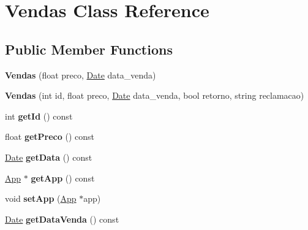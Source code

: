 \hypertarget{class_vendas}{\section{Vendas Class Reference}
\label{class_vendas}
}
\subsection*{Public Member Functions}
\begin{DoxyCompactItemize}
\item 
\hypertarget{class_vendas_a82262941ae2af8e2527d1859ebc7f5cd}{{\bfseries Vendas} (float preco, \hyperlink{class_date}{Date} data\+\_\+venda)}\label{class_vendas_a82262941ae2af8e2527d1859ebc7f5cd}

\item 
\hypertarget{class_vendas_a84f1ab71befc84a221bc4961f11cb934}{{\bfseries Vendas} (int id, float preco, \hyperlink{class_date}{Date} data\+\_\+venda, bool retorno, string reclamacao)}\label{class_vendas_a84f1ab71befc84a221bc4961f11cb934}

\item 
\hypertarget{class_vendas_a7e36a98494bec3b57d90afa0536a1be5}{int {\bfseries get\+Id} () const }\label{class_vendas_a7e36a98494bec3b57d90afa0536a1be5}

\item 
\hypertarget{class_vendas_aa5c8bcaced98ded9a22444ddf5935566}{float {\bfseries get\+Preco} () const }\label{class_vendas_aa5c8bcaced98ded9a22444ddf5935566}

\item 
\hypertarget{class_vendas_ab4f3bd058d7cfe6fc837e7804b9b3dcf}{\hyperlink{class_date}{Date} {\bfseries get\+Data} () const }\label{class_vendas_ab4f3bd058d7cfe6fc837e7804b9b3dcf}

\item 
\hypertarget{class_vendas_ab900328b9ac3c5e072ad6d7a42f530a3}{\hyperlink{class_app}{App} $\ast$ {\bfseries get\+App} () const }\label{class_vendas_ab900328b9ac3c5e072ad6d7a42f530a3}

\item 
\hypertarget{class_vendas_aeb3fa665d5c3aaf74caf7c1f024f545c}{void {\bfseries set\+App} (\hyperlink{class_app}{App} $\ast$app)}\label{class_vendas_aeb3fa665d5c3aaf74caf7c1f024f545c}

\item 
\hypertarget{class_vendas_a558102d2f9a43bd42bffcdbdd5289555}{\hyperlink{class_date}{Date} {\bfseries get\+Data\+Venda} () const }\label{class_vendas_a558102d2f9a43bd42bffcdbdd5289555}


\end{DoxyCompactItemize}
